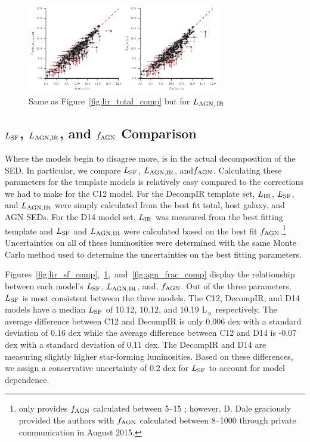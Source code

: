 \documentclass[fleqn, usenatbib]{mnras}
\newcommand{\lsun}{L$_{\sun}$}
\begin{document}
\begin{figure}
\includegraphics[width=0.75\textwidth]{figures/lir_agn-comparison_nokde}
\caption{Same as Figure~\ref{fig:lir_total_comp} but for $L_{\rm AGN,\,IR}$ \label{fig:lir_agn_comp}}
\end{figure}


\subsection{$L_{\rm SF}$, $L_{\rm AGN, IR}$, and $f_{\rm AGN}$ Comparison}
Where the models begin to disagree more, is in the actual decomposition of the SED. In particular, we compare $L_{\rm SF}$, $L_{\rm AGN, IR}$, and$f_{\rm AGN}$. Calculating these parameters for the template models is relatively easy compared to the corrections we had to make for the C12 model. For the DecompIR template set, $L_{\rm IR}$, $L_{\rm SF}$, and $L_{\rm AGN, IR}$ were simply calculated from the best fit total, host galaxy, and AGN SEDs. For the D14 model set, $L_{\rm IR}$ was measured from the best fitting template and $L_{\rm SF}$ and $L_{\rm AGN, IR}$ were calculated based on the best fit $f_{\rm AGN}$.\footnote{\citet{Dale:2014yq} only provides $f_{\rm AGN}$ calculated between 5--15 \micron; however, D. Dale graciously provided the authors with $f_{\rm AGN}$ calculated between 8--1000 \micron{} through private communication in August 2015.} Uncertainties on all of these luminosities were determined with the same Monte Carlo method used to determine the uncertainties on the best fitting parameters.

Figures~\ref{fig:lir_sf_comp},~\ref{fig:lir_agn_comp},~and~\ref{fig:agn_frac_comp} display the relationship between each model's $L_{\rm SF}$, $L_{\rm AGN, IR}$, and, $f_{\rm AGN}$. Out of the three parameters, $L_{\rm SF}$ is most consistent between the three models. The C12, DecompIR, and D14 models have a median $L_{\rm SF}$ of 10.12, 10.12, and 10.19 \lsun{} respectively. The average difference between C12 and DecompIR is only 0.006 dex with a standard deviation of 0.16 dex while the average difference between C12 and D14 is -0.07 dex with a standard deviation of 0.11 dex. The DecompIR and D14 are measuring slightly higher star-forming luminosities. Based on these differences, we assign a conservative uncertainty of 0.2 dex for $L_{\rm SF}$ to account for model dependence.
\end{document}
